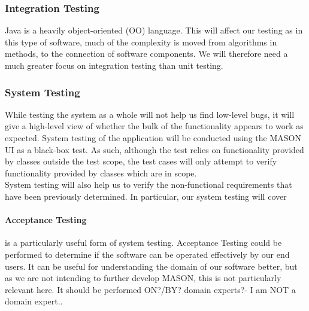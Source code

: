 \documentclass[11pt]{article}
\begin{document}

\subsubsection{Integration Testing}

Java is a heavily object-oriented (OO) language. This will affect our testing as in this type of software, much of the complexity is moved from algorithms in methods, to the connection of software components\cite[pp.236]{introduction_book}. We will therefore need a much greater focus on integration testing than unit testing.




\subsubsection{System Testing}
While testing the system as a whole will not help us find low-level bugs, it will give a high-level view of whether the bulk of the functionality appears to work as expected.
System testing of the application will be conducted using the MASON UI as a black-box test. As such, although the test relies on functionality provided by classes outside the test scope, the test cases will only attempt to verify functionality provided by classes which are in scope.
\\

System testing will also help us to verify the non-functional requirements that have been previously determined.
In particular, our system testing will cover

\paragraph{Acceptance Testing}
is a particularly useful form of system testing.
Acceptance Testing could be performed to determine if the software can be operated effectively by our end users.
It can be useful for understanding the domain of our software better, but as we are not intending to further develop MASON, this is not particularly relevant here.
It should be performed ON?/BY? domain experts?- I am NOT a domain expert..
\\
\end{document}

